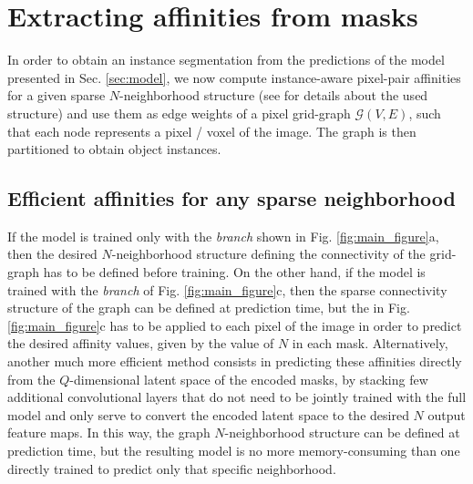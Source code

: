 \section{Extracting affinities from \maskname masks}
In order to obtain an instance segmentation from the predictions of the model presented in Sec. \ref{sec:model}, we now compute instance-aware pixel-pair affinities for a given sparse $N$-neighborhood structure (see  for details about the used structure) and use them as edge weights of a pixel grid-graph $\mathcal{G}(V,E)$, such that each node represents a pixel / voxel of the image. The graph is then partitioned to obtain object instances.



\subsection{Efficient affinities for any sparse neighborhood}\label{sec:efficient_affs}
If the model is trained only with the \emph{\sparseBr branch} shown in Fig. \ref{fig:main_figure}a, then the desired $N$-neighborhood structure defining the connectivity of the grid-graph has to be defined before training. 
On the other hand, if the model is trained with the \emph{\encBr branch} of Fig. \ref{fig:main_figure}c, then the sparse connectivity structure of the graph can be defined at prediction time, but the \maskDec in Fig. \ref{fig:main_figure}c has to be applied to each pixel of the image in order to predict the desired affinity values, given by the value of $N$ in each mask. 
Alternatively, another much more efficient method consists in predicting these affinities directly from the $Q$-dimensional latent space of the encoded masks, by stacking few additional convolutional layers that do not need to be jointly trained with the full model and only serve to convert the encoded latent space to the desired $N$ output feature maps.
In this way, the graph $N$-neighborhood structure can be defined at prediction time, but the resulting model is no more memory-consuming than one directly trained to predict only that specific neighborhood. 




